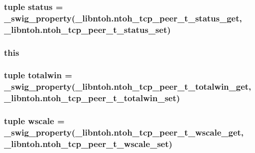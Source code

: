 \hypertarget{classlibntoh_1_1ntoh__tcp__peer__t_ad7843c85abee4764c9e717a8db8cb3a5}{
\subsubsection[{status}]{\setlength{\rightskip}{0pt plus 5cm}tuple status = {\bf \-\_\-swig\-\_\-property}(\-\_\-libntoh.\-ntoh\-\_\-tcp\-\_\-peer\-\_\-t\-\_\-status\-\_\-get, \-\_\-libntoh.\-ntoh\-\_\-tcp\-\_\-peer\-\_\-t\-\_\-status\-\_\-set)\hspace{0.3cm}{\ttfamily [static]}}}\label{classlibntoh_1_1ntoh__tcp__peer__t_ad7843c85abee4764c9e717a8db8cb3a5}
\hypertarget{classlibntoh_1_1ntoh__tcp__peer__t_a05c09a5e9d53fa7adf0a7936038c2fa3}{
\subsubsection[{this}]{\setlength{\rightskip}{0pt plus 5cm}this}}\label{classlibntoh_1_1ntoh__tcp__peer__t_a05c09a5e9d53fa7adf0a7936038c2fa3}
\hypertarget{classlibntoh_1_1ntoh__tcp__peer__t_a2806f6eb15dc5af0fbc1f184de81c626}{
\subsubsection[{totalwin}]{\setlength{\rightskip}{0pt plus 5cm}tuple totalwin = {\bf \-\_\-swig\-\_\-property}(\-\_\-libntoh.\-ntoh\-\_\-tcp\-\_\-peer\-\_\-t\-\_\-totalwin\-\_\-get, \-\_\-libntoh.\-ntoh\-\_\-tcp\-\_\-peer\-\_\-t\-\_\-totalwin\-\_\-set)\hspace{0.3cm}{\ttfamily [static]}}}\label{classlibntoh_1_1ntoh__tcp__peer__t_a2806f6eb15dc5af0fbc1f184de81c626}
\hypertarget{classlibntoh_1_1ntoh__tcp__peer__t_a17fc4fd78c94de2e5155e43de064f36c}{
\subsubsection[{wscale}]{\setlength{\rightskip}{0pt plus 5cm}tuple wscale = {\bf \-\_\-swig\-\_\-property}(\-\_\-libntoh.\-ntoh\-\_\-tcp\-\_\-peer\-\_\-t\-\_\-wscale\-\_\-get, \-\_\-libntoh.\-ntoh\-\_\-tcp\-\_\-peer\-\_\-t\-\_\-wscale\-\_\-set)\hspace{0.3cm}{\ttfamily [static]}}}\label{classlibntoh_1_1ntoh__tcp__peer__t_a17fc4fd78c94de2e5155e43de064f36c}
